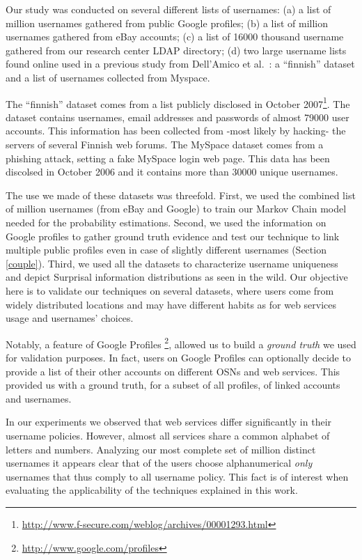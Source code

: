 \documentclass[letterpaper]{sig-alternate}
\begin{document}
Our study was conducted on several different lists of usernames: (a) a list of
 million usernames gathered from public Google profiles; (b) a list of
 million usernames gathered from eBay accounts; (c) a list of 16000
thousand username gathered from our research center LDAP directory; (d) two
large username lists found online used in a previous study from Dell'Amico et
al.~\cite{infocom10}: a ``finnish'' dataset and a list of usernames collected
from Myspace.  

The ``finnish'' dataset comes from a list publicly disclosed in October
2007\footnote{\url{http://www.f-secure.com/weblog/archives/00001293.html}}. The
dataset contains usernames, email addresses and passwords of almost 79000 user
accounts. This information has been collected from -most likely by hacking- the
servers of several Finnish web forums. The MySpace dataset comes from a
phishing attack, setting a fake MySpace login web page. This data has been
discolsed in October 2006 and 
it contains more than 30000 unique usernames.

The use we made of these datasets was threefold.  First, we used the combined
list of  million usernames (from eBay and Google) to train our Markov Chain
model needed for the probability estimations.  Second, we used the information
on Google profiles to gather ground truth evidence and test our technique to
link multiple public profiles even in case of slightly different usernames (Section \ref{couple}).
Third, we used all the datasets to characterize username uniqueness and depict
Surprisal information distributions as seen in the wild. Our objective here is
to validate our techniques on several datasets, where users come from widely
distributed locations and may have different habits as for web services usage
and usernames' choices. 

Notably, a feature of Google Profiles \footnote{\url{http://www.google.com/profiles}}, allowed us
to build a {\em ground truth} we used for validation purposes.
In fact, users on Google Profiles can optionally decide to provide a list of their
other accounts on different OSNs and web services.
This provided us with a ground truth, for a subset of all profiles,
of linked accounts and usernames.

In our experiments we observed that web services differ significantly in their
username policies.  However, almost all services share a common alphabet of
letters and numbers.  Analyzing our most complete set of  million distinct
usernames it appears clear that  of the users choose alphanumerical {\em
only} usernames that thus comply to all username policy.
This fact is of interest when evaluating the applicability of the techniques
explained in this work.
\end{document}

